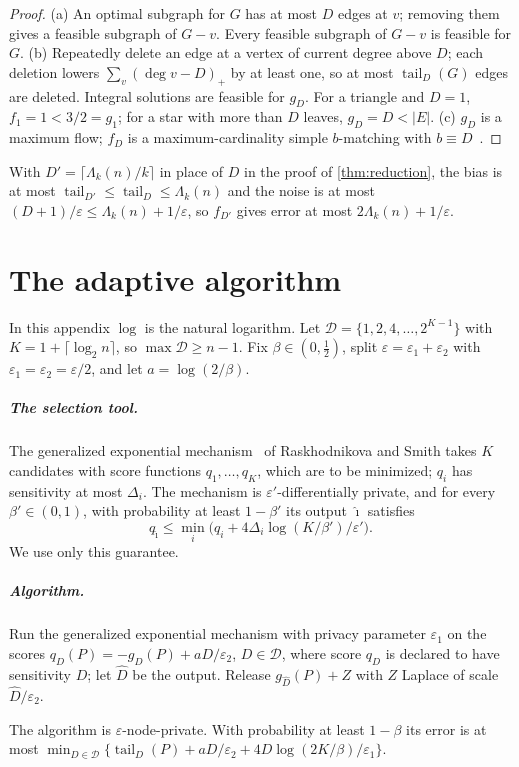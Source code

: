 \documentclass[anonymous,a4paper,USenglish,cleveref,autoref,thm-restate]{socg-lipics-v2021}
\newcommand{\eps}{\varepsilon}
\newcommand{\Lam}{\Lambda}
\newcommand{\tail}{\operatorname{tail}}
\begin{document}
\begin{proof}
(a) An optimal subgraph for $G$ has at most $D$ edges at $v$; removing them gives a feasible subgraph of $G-v$. Every feasible subgraph of $G-v$ is feasible for $G$. (b) Repeatedly delete an edge at a vertex of current degree above $D$; each deletion lowers $\sum_v(\deg v-D)_+$ by at least one, so at most $\tail_D(G)$ edges are deleted. Integral solutions are feasible for $g_D$. For a triangle and $D=1$, $f_1=1<3/2=g_1$; for a star with more than $D$ leaves, $g_D=D<|E|$. (c) $g_D$ is a maximum flow; $f_D$ is a maximum-cardinality simple $b$-matching with $b\equiv D$~\cite{Schrijver03,Gabow18}.
\end{proof}

With $D'=\lceil\Lam_k(n)/k\rceil$ in place of $D$ in the proof of \cref{thm:reduction}, the bias is at most $\tail_{D'}\le\tail_{D}\le\Lam_k(n)$ and the noise is at most $(D+1)/\eps\le\Lam_k(n)+1/\eps$, so $f_{D'}$ gives error at most $2\Lam_k(n)+1/\eps$.

\section{The adaptive algorithm}
\label{app:adaptive}

In this appendix $\log$ is the natural logarithm. Let $\mathcal D=\{1,2,4,\dots,2^{K-1}\}$ with $K=1+\lceil\log_2 n\rceil$, so $\max\mathcal D\ge n-1$. Fix $\beta\in(0,\frac12)$, split $\eps=\eps_1+\eps_2$ with $\eps_1=\eps_2=\eps/2$, and let $a=\log(2/\beta)$.

\subparagraph*{The selection tool.} The generalized exponential mechanism~\cite{RS16} of Raskhodnikova and Smith takes $K$ candidates with score functions $q_1,\dots,q_K$, which are to be minimized; $q_i$ has sensitivity at most $\Delta_i$. The mechanism is $\eps'$-differentially private, and for every $\beta'\in(0,1)$, with probability at least $1-\beta'$ its output $\hat\imath$ satisfies
\[
  q_{\hat\imath}\le\min_i\bigl(q_i+4\Delta_i\log(K/\beta')/\eps'\bigr).
\]
We use only this guarantee.

\subparagraph*{Algorithm.} Run the generalized exponential mechanism with privacy parameter $\eps_1$ on the scores $q_D(P)=-g_D(P)+aD/\eps_2$, $D\in\mathcal D$, where score $q_D$ is declared to have sensitivity $D$; let $\widehat D$ be the output. Release $g_{\widehat D}(P)+Z$ with $Z$ Laplace of scale $\widehat D/\eps_2$.

\begin{lemma}
\label{lem:adaptive-oracle}
The algorithm is $\eps$-node-private. With probability at least $1-\beta$ its error is at most $\min_{D\in\mathcal D}\{\tail_D(P)+aD/\eps_2+4D\log(2K/\beta)/\eps_1\}$.
\end{lemma}
\end{document}
